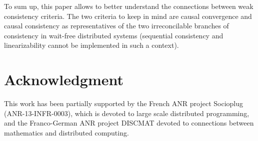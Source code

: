 \documentclass[9pt,numbers]{sigplanconf}
\begin{document}
To sum up, this paper allows to better understand the connections between weak consistency criteria. The two criteria to keep in mind are causal convergence and causal consistency as representatives of the two irreconcilable branches of consistency in wait-free distributed systems (sequential consistency and linearizability cannot be implemented in such a context). 

\section*{Acknowledgment}\label{section:ack}

This work has been partially supported by the  French ANR project Socioplug (ANR-13-INFR-0003),
which is devoted to large scale distributed programming, and the Franco-German ANR project DISCMAT 
devoted to connections between mathematics  and distributed computing.



\end{document}
